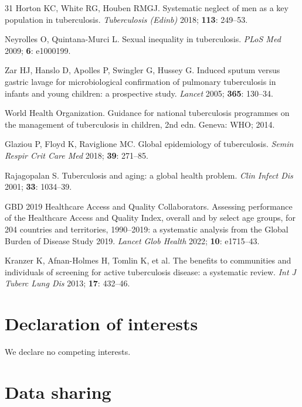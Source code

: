 \documentclass[12pt]{article}
\begin{document}
\begin{thebibliography}{31}
Horton KC, White RG, Houben RMGJ. Systematic neglect of men as a key population in tuberculosis. \textit{Tuberculosis (Edinb)} 2018; \textbf{113}: 249--53.

Neyrolles O, Quintana-Murci L. Sexual inequality in tuberculosis. \textit{PLoS Med} 2009; \textbf{6}: e1000199.

Zar HJ, Hanslo D, Apolles P, Swingler G, Hussey G. Induced sputum versus gastric lavage for microbiological confirmation of pulmonary tuberculosis in infants and young children: a prospective study. \textit{Lancet} 2005; \textbf{365}: 130--34.

World Health Organization. Guidance for national tuberculosis programmes on the management of tuberculosis in children, 2nd edn. Geneva: WHO; 2014.

Glaziou P, Floyd K, Raviglione MC. Global epidemiology of tuberculosis. \textit{Semin Respir Crit Care Med} 2018; \textbf{39}: 271--85.

Rajagopalan S. Tuberculosis and aging: a global health problem. \textit{Clin Infect Dis} 2001; \textbf{33}: 1034--39.

GBD 2019 Healthcare Access and Quality Collaborators. Assessing performance of the Healthcare Access and Quality Index, overall and by select age groups, for 204 countries and territories, 1990--2019: a systematic analysis from the Global Burden of Disease Study 2019. \textit{Lancet Glob Health} 2022; \textbf{10}: e1715--43.

Kranzer K, Afnan-Holmes H, Tomlin K, et al. The benefits to communities and individuals of screening for active tuberculosis disease: a systematic review. \textit{Int J Tuberc Lung Dis} 2013; \textbf{17}: 432--46.

\end{thebibliography}


\clearpage

\section*{Declaration of interests}

We declare no competing interests.

\section*{Data sharing}
\end{document}
